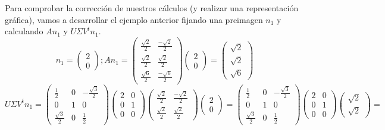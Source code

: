 Para comprobar la corrección de nuestros cálculos (y realizar una representación gráfica), vamos a desarrollar el ejemplo anterior fijando una preimagen $n_1$ y calculando $An_1$ y $U\Sigma V^tn_1$.
\[
	n_1=\begin{pmatrix}
		2 \\
		0
	\end{pmatrix}; An_1=\begin{pmatrix}
		\frac{\sqrt2}{2} & \frac{-\sqrt2}{2} \\
		\frac{\sqrt2}{2} & \frac{\sqrt2}{2}  \\
		\frac{\sqrt6}{2} & \frac{-\sqrt6}{2}
	\end{pmatrix}
	\begin{pmatrix}
		2 \\
		0
	\end{pmatrix}
	=
	\begin{pmatrix}
		\sqrt2 \\
		\sqrt2 \\
		\sqrt6
	\end{pmatrix}
\]
\[
	U\Sigma V^tn_1=\begin{pmatrix}
		\frac{1}{2}      & 0 & -\frac{\sqrt3}{2} \\
		0                & 1 & 0                 \\
		\frac{\sqrt3}{2} & 0 & \frac{1}{2}
	\end{pmatrix}
	\begin{pmatrix}
		2 & 0 \\
		0 & 1 \\
		0 & 0
	\end{pmatrix}
	\begin{pmatrix}
		\frac{\sqrt2}{2} & \frac{-\sqrt2}{2} \\
		\frac{\sqrt2}{2} & \frac{\sqrt2}{2}
	\end{pmatrix}
	\begin{pmatrix}
		2 \\
		0
	\end{pmatrix}
	=
	\begin{pmatrix}
		\frac{1}{2}      & 0 & -\frac{\sqrt3}{2} \\
		0                & 1 & 0                 \\
		\frac{\sqrt3}{2} & 0 & \frac{1}{2}
	\end{pmatrix}
	\begin{pmatrix}
		2 & 0 \\
		0 & 1 \\
		0 & 0
	\end{pmatrix}
	\begin{pmatrix}
		\sqrt2 \\
		\sqrt2
	\end{pmatrix}
	=
\]
